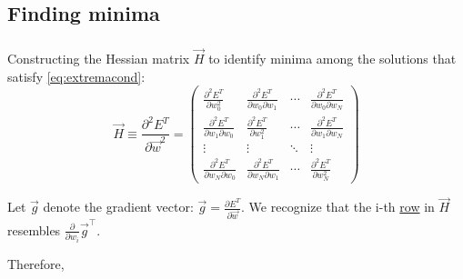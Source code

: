 \subsection{Finding minima}

\begin{frame}\frametitle{\subsecname}

Constructing the Hessian matrix $\vec H$ to identify minima among the solutions that satisfy \eqref{eq:extremacond}:
\begin{equation}
\vec{H} \equiv \frac{\partial^2 E^T}{\partial\vec{w}^2} =
\left(\begin{array}{cccc}  
  \frac{\partial^2 E^T}{\partial w_0^2} &
  \frac{\partial^2 E^T}{\partial w_0\partial w_1} & \cdots &
  \frac{\partial^2 E^T}{\partial w_0\partial w_N} \\
  \frac{\partial^2 E^T}{\partial w_1\partial w_0} &
  \frac{\partial^2 E^T}{\partial w_1^2} & \cdots &
  \frac{\partial^2 E^T}{\partial w_1\partial w_N} \\
  \vdots & \vdots & \ddots & \vdots \\
  \frac{\partial^2 E^T}{\partial w_N\partial w_0} &
  \frac{\partial^2 E^T}{\partial w_N\partial w_1} & \cdots &
  \frac{\partial^2 E^T}{\partial w_N^2}
\end{array}\right)
\end{equation}

Let $\vec g$ denote the gradient vector: $\vec g = \frac{\partial E^{T}}{\partial \vec w}$. 
We recognize that the i-th \underline{row} in $\vec H$ resembles $\frac{\partial}{\partial w_i}\vec g^\top$.

Therefore,


\end{frame}
